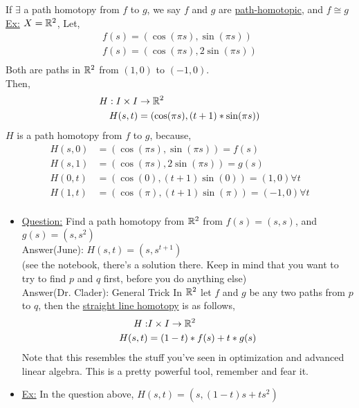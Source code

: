     \begin{definition} If $\exists$ a path homotopy from $f$ to $g$, we say $f$ and $g$ are \underline{path-homotopic}, and $f\cong g$\\
        \underline{Ex:} $X=\mathbb{R}^2$, Let,
        \begin{align*}
            f(s)=(\cos(\pi s), \sin(\pi s))\\
            f(s)=(\cos(\pi s), 2\sin(\pi s))\\
        \end{align*}
        Both are paths in $\mathbb{R}^2$ from $(1,0)$ to $(-1,0)$.\\
        Then,
        \begin{align*}
            H: I\times I &\rightarrow \mathbb{R}^2\\
            H(s,t)&=(\cos(\pi s), (t+1)*\sin(\pi s))\\
        \end{align*}
        $H$ is a path homotopy from $f$ to $g$, because,
        \begin{align*}
            H(s,0)&=(\cos(\pi s), \sin(\pi s))=f(s)\\
            H(s,1)&=(\cos(\pi s), 2\sin(\pi s))=g(s)\\
            H(0,t)&=(\cos(0), (t+1)\sin(0))=(1,0)\forall t\\
            H(1,t)&=(\cos(\pi), (t+1)\sin(\pi))=(-1,0)\forall t\\
        \end{align*}
    \end{definition}
    \begin{itemize}
        \item \underline{Question:} Find a path homotopy from $\mathbb{R}^2$ from $f(s)=(s,s)$, and $g(s)=(s,s^2)$\\
            Answer(June): $H(s,t)=(s,s^{t+1})$\\
            (see the notebook, there's a solution there. Keep in mind that you want to try to find $p$ and $q$ first, before you do anything else)\\
            Answer(Dr. Clader): General Trick In $\mathbb{R}^2$ let $f$ and $g$ be any two paths from $p$ to $q$, then the
            \underline{straight line homotopy} is as follows,
            \begin{align*}
                H: &I \times I \rightarrow \mathbb{R}^2\\
                H(s,t)&=(1-t)*f(s)+t*g(s)\\
            \end{align*}
            Note that this resembles the stuff you've seen in optimization and advanced linear algebra. This is a pretty powerful tool,
            remember and fear it.
        \item \underline{Ex:} In the question above, $H(s, t)=(s, (1-t)s+ts^2)$
    \end{itemize}
